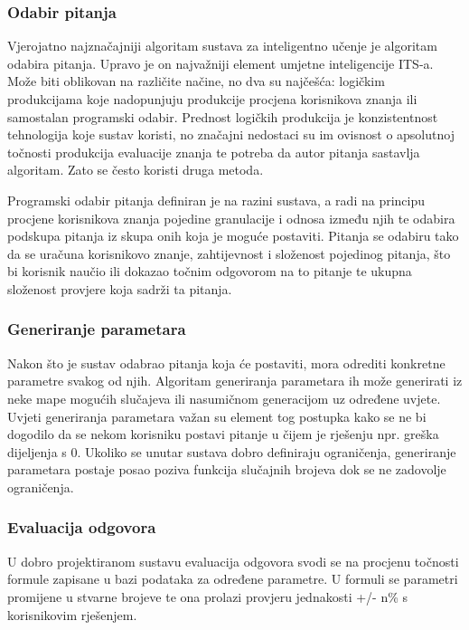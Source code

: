 \documentclass[times, utf8, zavrsni, numeric]{fer}
\begin{document}
\subsubsection{Odabir pitanja}
Vjerojatno najznačajniji algoritam sustava za inteligentno učenje je algoritam odabira pitanja. Upravo je on najvažniji element umjetne inteligencije ITS-a.\cite{aect} Može biti oblikovan na različite načine, no dva su najčešća: logičkim produkcijama koje nadopunjuju produkcije procjena korisnikova znanja ili samostalan programski odabir. Prednost logičkih produkcija je konzistentnost tehnologija koje sustav koristi, no značajni nedostaci su im ovisnost o apsolutnoj točnosti produkcija evaluacije znanja te potreba da autor pitanja sastavlja algoritam. Zato se često koristi druga metoda.
\par
Programski odabir pitanja definiran je na razini sustava, a radi na principu procjene korisnikova znanja pojedine granulacije i odnosa između njih te odabira podskupa pitanja iz skupa onih koja je moguće postaviti. Pitanja se odabiru tako da se uračuna korisnikovo znanje, zahtijevnost i složenost pojedinog pitanja, što bi korisnik naučio ili dokazao točnim odgovorom na to pitanje te ukupna složenost provjere koja sadrži ta pitanja.

\subsubsection{Generiranje parametara}
Nakon što je sustav odabrao pitanja koja će postaviti, mora odrediti konkretne parametre svakog od njih. Algoritam generiranja parametara ih može generirati iz neke mape mogućih slučajeva ili nasumičnom generacijom uz određene uvjete. Uvjeti generiranja parametara važan su element tog postupka kako se ne bi dogodilo da se nekom korisniku postavi pitanje u čijem je rješenju npr. greška dijeljenja s 0. Ukoliko se unutar sustava dobro definiraju ograničenja, generiranje parametara postaje posao poziva funkcija slučajnih brojeva dok se ne zadovolje ograničenja.

\subsubsection{Evaluacija odgovora}
U dobro projektiranom sustavu evaluacija odgovora svodi se na procjenu točnosti formule zapisane u bazi podataka za određene parametre. U formuli se parametri promijene u stvarne brojeve te ona prolazi provjeru jednakosti +/- n\% s korisnikovim rješenjem.
\end{document}

